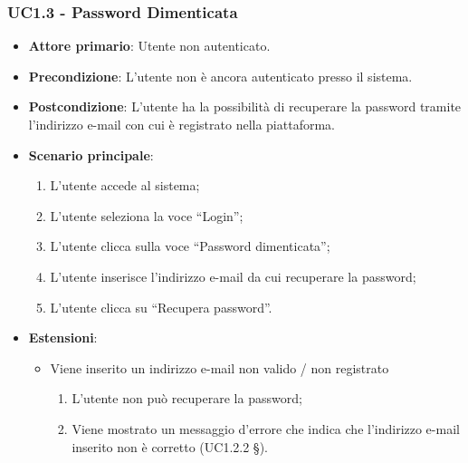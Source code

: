 \subsubsection{UC1.3 - Password Dimenticata}
\begin{itemize}
\item \textbf{Attore primario}: Utente non autenticato.
\item \textbf{Precondizione}: L’utente non è ancora autenticato presso il sistema.
\item \textbf{Postcondizione}: L’utente ha la possibilità di recuperare la password tramite l'indirizzo e-mail con cui è registrato nella piattaforma.

\item \textbf{Scenario principale}:
\begin{enumerate}
\item L’utente accede al sistema;
\item L’utente seleziona la voce “Login”;
\item L’utente clicca sulla voce “Password dimenticata”;
\item L’utente inserisce l’indirizzo e-mail da cui recuperare la password;
\item L’utente clicca su “Recupera password”. 
\end{enumerate}

\item \textbf{Estensioni}:
\begin{itemize}
\item Viene inserito un indirizzo e-mail non valido / non registrato
\begin{enumerate}
	\item L’utente non può recuperare la password;
	\item Viene mostrato un messaggio d’errore che indica che l’indirizzo e-mail inserito non è corretto (UC1.2.2 §).
\end{enumerate}
\end{itemize}
\end{itemize}

